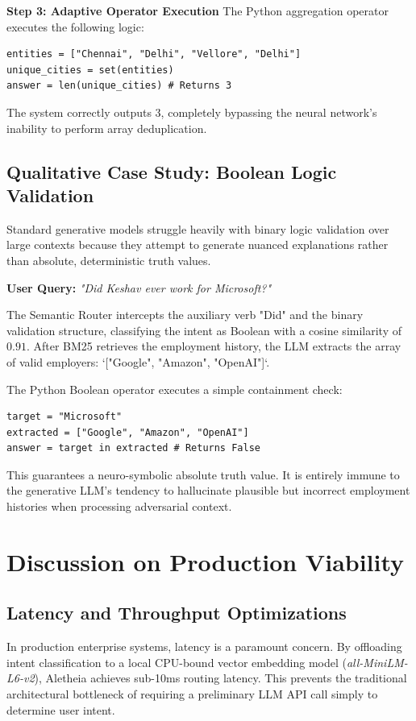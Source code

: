 \documentclass[journal,10pt]{IEEEtran}
\begin{document}
\textbf{Step 3: Adaptive Operator Execution}
The Python aggregation operator executes the following logic:
\begin{verbatim}
entities = ["Chennai", "Delhi", "Vellore", "Delhi"]
unique_cities = set(entities)
answer = len(unique_cities) # Returns 3
\end{verbatim}
The system correctly outputs 3, completely bypassing the neural network's inability to perform array deduplication.

\subsection{Qualitative Case Study: Boolean Logic Validation}
Standard generative models struggle heavily with binary logic validation over large contexts because they attempt to generate nuanced explanations rather than absolute, deterministic truth values. 

\textbf{User Query:} \textit{"Did Keshav ever work for Microsoft?"}

The Semantic Router intercepts the auxiliary verb "Did" and the binary validation structure, classifying the intent as Boolean with a cosine similarity of $0.91$. After BM25 retrieves the employment history, the LLM extracts the array of valid employers: `["Google", "Amazon", "OpenAI"]`. 

The Python Boolean operator executes a simple containment check:
\begin{verbatim}
target = "Microsoft"
extracted = ["Google", "Amazon", "OpenAI"]
answer = target in extracted # Returns False
\end{verbatim}
This guarantees a neuro-symbolic absolute truth value. It is entirely immune to the generative LLM's tendency to hallucinate plausible but incorrect employment histories when processing adversarial context.

\section{Discussion on Production Viability}

\subsection{Latency and Throughput Optimizations}
In production enterprise systems, latency is a paramount concern. By offloading intent classification to a local CPU-bound vector embedding model (\textit{all-MiniLM-L6-v2}), Aletheia achieves sub-10ms routing latency. This prevents the traditional architectural bottleneck of requiring a preliminary LLM API call simply to determine user intent. 
\end{document}
